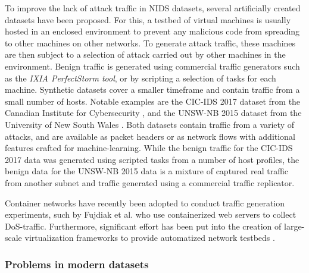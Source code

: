 \documentclass{article}
\begin{document}
To improve the lack of attack traffic in NIDS datasets, several artificially created datasets have been proposed. For this, a testbed of virtual machines is usually hosted in an enclosed environment to prevent any malicious code from spreading to other machines on other networks. To generate attack traffic, these machines are then subject to a selection of attack carried out by other machines in the environment. Benign traffic is generated using commercial traffic generators such as the \emph{IXIA PerfectStorm tool}, or by scripting a selection of tasks for each machine. Synthetic datasets cover a smaller timeframe and contain traffic from a small number of hosts. Notable examples are the CIC-IDS 2017 dataset from the Canadian Institute for Cybersecurity \cite{sharafaldin2018towards}, %
and the UNSW-NB 2015 dataset from the University of New South Wales \cite{moustafa_unsw-nb15:_2015}. Both datasets contain traffic from a variety of attacks, and are available as packet headers or as network flows with additional features crafted for machine-learning. While the benign traffic for the CIC-IDS 2017 data was generated using scripted tasks from a number of host profiles, the benign data for the UNSW-NB 2015 data is a mixture of captured real traffic from another subnet and traffic generated using a commercial traffic replicator. 



Container networks have recently been adopted to conduct traffic generation experiments, such by Fujdiak et al. \cite{fujdiak2018ip} who use containerized web servers to collect DoS-traffic. Furthermore, significant effort has been put into the creation of large-scale virtualization frameworks to provide automatized network testbeds \cite{crussell2015minimega, badiger2018violet}.




\subsubsection{Problems in modern datasets}\label{Sec:problems}
\end{document}
